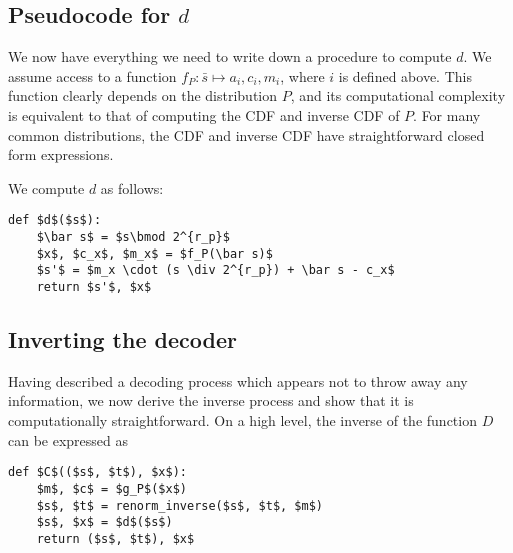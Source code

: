 \documentclass{article}
\begin{document}
\subsection*{Pseudocode for $d$}
We now have everything we need to write down a procedure to compute $d$. We
assume access to a function $f_P:\bar{s}\mapsto a_i, c_i, m_i$, where $i$ is
defined above. This function clearly depends on the distribution $P$, and its
computational complexity is equivalent to that of computing the CDF and inverse
CDF of $P$. For many common distributions, the CDF and inverse CDF have
straightforward closed form expressions.

We compute $d$ as follows:
\begin{lstlisting}
def $d$($s$):
    $\bar s$ = $s\bmod 2^{r_p}$
    $x$, $c_x$, $m_x$ = $f_P(\bar s)$
    $s'$ = $m_x \cdot (s \div 2^{r_p}) + \bar s - c_x$
    return $s'$, $x$
\end{lstlisting}

\subsection*{Inverting the decoder}
Having described a decoding process which appears not to throw away any
information, we now derive the inverse process and show that it is
computationally straightforward. On a high level, the inverse of the function
$D$ can be expressed as
\begin{lstlisting}
def $C$(($s$, $t$), $x$):
    $m$, $c$ = $g_P$($x$)
    $s$, $t$ = renorm_inverse($s$, $t$, $m$)
    $s$, $x$ = $d$($s$)
    return ($s$, $t$), $x$
\end{lstlisting}
\printbibliography
\end{document}
